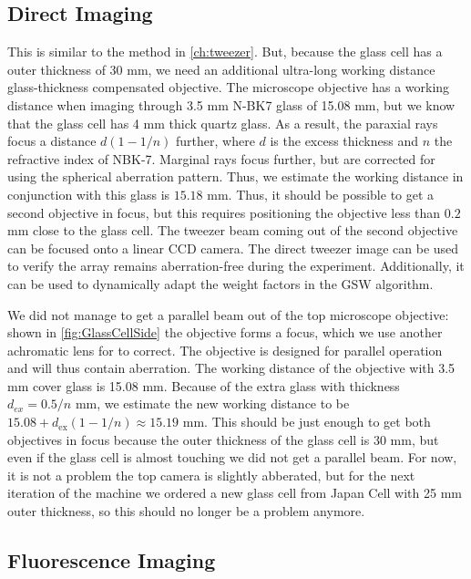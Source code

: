 \subsection{Direct Imaging}

This is similar to the method in \cref{ch:tweezer}. 
But, because the glass cell has a outer thickness of 30 mm, we need an additional ultra-long working distance glass-thickness compensated objective.
The microscope objective has a working distance when imaging through 3.5 mm N-BK7 glass of 15.08 mm, but we know that the glass cell has 4 mm thick quartz glass.
As a result, the paraxial rays focus a distance $d(1-1/n)$ further, where $d$ is the excess thickness and $n$ the refractive index of NBK-7.
Marginal rays focus further, but are corrected for using the spherical aberration pattern. 
Thus, we estimate the working distance in conjunction with this glass is $15.18$ mm. 
Thus, it should be possible to get a second objective in focus, but this requires positioning the objective less than $0.2$ mm close to the glass cell.
The tweezer beam coming out of the second objective can be focused onto a linear CCD camera. 
The direct tweezer image can be used to verify the array remains aberration-free during the experiment. 
Additionally, it can be used to dynamically adapt the weight factors in the \ac{GSW} algorithm. 

We did not manage to get a parallel beam out of the top microscope objective: shown in \cref{fig:GlassCellSide} the objective forms a focus, which we use another achromatic lens for to correct. 
The objective is designed for parallel operation and will thus contain aberration. 
The working distance of the objective with 3.5 mm cover glass is 15.08 mm. 
Because of the extra glass with thickness $d_{ex} = 0.5/n$ mm, we estimate the new working distance to be $15.08 + d_{\text{ex}}(1-1/n) \approx 15.19$ mm.
This should be just enough to get both objectives in focus because the outer thickness of the glass cell is 30 mm, but even if the glass cell is almost touching we did not get a parallel beam. 
For now, it is not a problem the top camera is slightly abberated, but for the next iteration of the machine we ordered a new glass cell from Japan Cell with 25 mm outer thickness, so this should no longer be a problem anymore.  

\subsection{Fluorescence Imaging}

